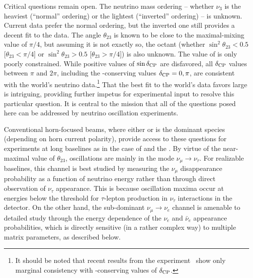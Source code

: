 Critical questions remain open. The neutrino mass ordering -- whether $\nu_3$ is 
the heaviest (``normal'' ordering) or the lightest (``inverted'' ordering) -- is unknown. 
Current data prefer the normal ordering, but the inverted one still 
provides a decent fit to the data. The angle $\theta_{23}$ is known to be 
close to the maximal-mixing value of $\pi/4$, but assuming it is not exactly 
so, the octant 
(whether $\sin^2\theta_{23}<0.5$ [$\theta_{23}<\pi/4$] or 
$\sin^2\theta_{23}>0.5$ [$\theta_{23}>\pi/4$]) is also unknown. 
The value of \deltacp is only poorly constrained. 
While positive values of $\sin\delta_{\rm CP}$ are disfavored, all $\delta_{\rm CP}$ values between $\pi$ and $2\pi$, including the -conserving values $\delta_{\rm CP}=0,\pi$, are consistent with the world's neutrino data.\footnote{It should be noted that recent results from the  experiment~\cite{Abe:2019vii} show only marginal consistency with -conserving values of $\delta_{\rm CP}$.}
That the best fit to the world's data 
favors large  is intriguing, providing further impetus 
for experimental input to resolve this particular question.
It is central to the  mission that all of the questions 
posed here can be addressed 
by neutrino oscillation experiments.

Conventional horn-focused beams, where either \numu or \anumu 
is the dominant species (depending on horn current polarity), provide 
access to these questions for experiments at long baselines as in the case 
of  and the .  By virtue 
of the near-maximal value of $\theta_{23}$, oscillations are mainly in the  
mode $\nu_\mu \rightarrow \nu_\tau$.  For realizable baselines, 
this channel is best studied by 
measuring the $\nu_\mu$ disappearance probability as a function of 
neutrino energy rather than through direct observation of $\nu_\tau$ 
appearance.  This is because oscillation maxima occur at energies 
below the threshold for $\tau$-lepton production in $\nu_\tau$ 
 interactions in the detector.
On the other hand, the sub-dominant $\nu_\mu \rightarrow \nu_e$ channel is 
amenable to detailed study through the energy dependence of the
$\nu_e$ and $\bar\nu_e$ appearance probabilities, 
which is directly sensitive (in a rather complex way) to 
multiple  matrix parameters, as described below.  

